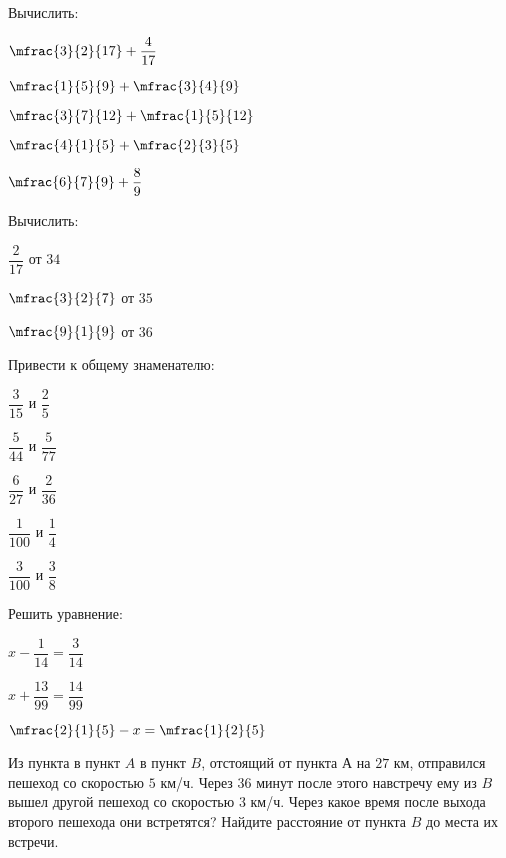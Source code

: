 \begin{listofex}
	\item Вычислить:
	\begin{enumcols}[itemcolumns=5]
		\item \( \mfrac{3}{2}{17}+\dfrac{4}{17} \)
		\item \( \mfrac{1}{5}{9}+\mfrac{3}{4}{9} \)
		\item \( \mfrac{3}{7}{12}+\mfrac{1}{5}{12} \)
		\item \( \mfrac{4}{1}{5}+\mfrac{2}{3}{5} \)
		\item \( \mfrac{6}{7}{9}+\dfrac{8}{9} \)
	\end{enumcols}
	\item Вычислить:
	\begin{enumcols}[itemcolumns=3]
		\item \( \dfrac{2}{17} \) от \( 34 \)
		\item \( \mfrac{3}{2}{7} \) от \( 35 \)
		\item \( \mfrac{9}{1}{9} \) от \( 36 \)
	\end{enumcols}
	\item Привести к общему знаменателю:
	\begin{enumcols}[itemcolumns=5]
		\item \( \dfrac{3}{15} \) и \( \dfrac{2}{5} \)
		\item \( \dfrac{5}{44} \) и \( \dfrac{5}{77} \)
		\item \( \dfrac{6}{27} \) и \( \dfrac{2}{36} \)
		\item \( \dfrac{1}{100} \) и \( \dfrac{1}{4} \)
		\item \( \dfrac{3}{100} \) и \( \dfrac{3}{8} \)
	\end{enumcols}
	\item Решить уравнение:
	\begin{enumcols}[itemcolumns=3]
		\item \( x-\dfrac{1}{14}=\dfrac{3}{14} \)
		\item \( x+\dfrac{13}{99}=\dfrac{14}{99} \)
		\item \( \mfrac{2}{1}{5}-x=\mfrac{1}{2}{5} \)
	\end{enumcols}
	\item Из пункта в пункт \( A \) в пункт \( B \), отстоящий от пункта \( А \) на \( 27 \) км, отправился пешеход со скоростью \( 5 \) км/ч. Через \( 36 \) минут после этого навстречу ему из \( B \) вышел другой пешеход со скоростью \( 3 \) км/ч. Через какое время после выхода второго пешехода они встретятся? Найдите расстояние от пункта \( B \) до места их встречи.
\end{listofex}
